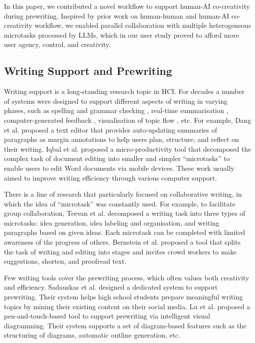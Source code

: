 In this paper, we contributed a novel workflow to support human-AI co-creativity during prewriting. Inspired by prior work on human-human and human-AI co-creativity workflow, we enabled parallel collaboration with multiple heterogeneous microtasks processed by LLMs, which in our user study proved to afford more user agency, control, and creativity.

\subsection{Writing Support and Prewriting}
Writing support is a long-standing research topic in HCI. For decades a number of systems were designed to support different aspects of writing in varying phases, such as spelling and grammar checking \cite{leacock2010automated}, real-time summarisation \cite{dang2022beyond}, computer-generated feedback \cite{villalon2008glosser}, visualisation of topic flow \cite{o2009visualizing,o2011visualizing}, etc. For example, Dang et al. \cite{dang2022beyond} proposed a text editor that provides auto-updating summaries of paragraphs as margin annotations to help users plan, structure, and reflect on their writing. Iqbal et al. \cite{iqbal2018multitasking} proposed a micro-productivity tool that decomposed the complex task of document editing into smaller and simpler ``microtasks'' to enable users to edit Word documents via mobile devices. These work usually aimed to improve writing efficiency through various computer support.

There is a line of research that particularly focused on collaborative writing, in which the idea of ``microtask'' was constantly used. For example, to facilitate group collaboration, Teevan et al. \cite{teevan2016supporting} decomposed a writing task into three types of microtasks: idea generation, idea labeling and organisation, and writing paragraphs based on given ideas. Each microtask can be completed with limited awareness of the progress of others. Bernstein et al. \cite{bernstein2010soylent} proposed a tool that splits the task of writing and editing into stages and invites crowd workers to make suggestions, shorten, and proofread text.

Few writing tools cover the prewriting process, which often values both creativity and efficiency. Sadauskas et al. \cite{sadauskas2015mining} designed a dedicated system to support prewriting. Their system helps high school students prepare meaningful writing topics by mining their existing content on their social media. Lu et al. \cite{lu2018inkplanner} proposed a pen-and-touch-based tool to support prewriting via intelligent visual diagramming. Their system supports a set of diagram-based features such as the structuring of diagrams, automatic outline generation, etc.

